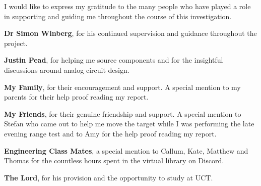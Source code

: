 I would like to express my gratitude to the many people who have played a role in supporting and guiding me throughout the course of this investigation.


\textbf{Dr Simon Winberg}, for his continued supervision and guidance throughout the project.

\textbf{Justin Pead}, for helping me source components and for the insightful discussions around analog circuit design.

\textbf{My Family}, for their encouragement and support. A special mention to my parents for their help proof reading my report.

\textbf{My Friends}, for their genuine friendship and support. A special mention to Stefan who came out to help me move the target while I was performing the late evening range test and to Amy for the help proof reading my report.

\textbf{Engineering Class Mates}, a special mention to Callum, Kate, Matthew and Thomas for the countless hours spent in the virtual library on Discord.

\textbf{The Lord}, for his provision and the opportunity to study at UCT.


